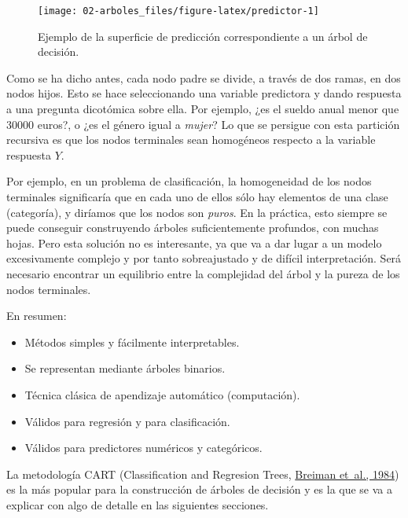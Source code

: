 \documentclass[
  spanish,
]{book}
\theoremstyle{break}
\theoremstyle{definition}
\theoremstyle{definition}
\theoremstyle{definition}
\theoremstyle{definition}
\theoremstyle{remark}
\begin{document}
\begin{figure}[!htb]

{\centering \texttt{[image: 02-arboles\_files/figure-latex/predictor-1]} 

}

\caption{Ejemplo de la superficie de predicción correspondiente a un árbol de decisión.}\label{fig:predictor}
\end{figure}

Como se ha dicho antes, cada nodo padre se divide, a través de dos ramas, en dos nodos hijos.
Esto se hace seleccionando una variable predictora y dando respuesta a una pregunta dicotómica sobre ella.
Por ejemplo, ¿es el sueldo anual menor que 30000 euros?, o ¿es el género igual a \emph{mujer}?
Lo que se persigue con esta partición recursiva es que los nodos terminales sean homogéneos respecto a la variable respuesta \(Y\).

Por ejemplo, en un problema de clasificación, la homogeneidad de los nodos terminales significaría que en cada uno de ellos sólo hay elementos de una clase (categoría), y diríamos que los nodos son \emph{puros}.
En la práctica, esto siempre se puede conseguir construyendo árboles suficientemente profundos, con muchas hojas.
Pero esta solución no es interesante, ya que va a dar lugar a un modelo excesivamente complejo y por tanto sobreajustado y de difícil interpretación.
Será necesario encontrar un equilibrio entre la complejidad del árbol y la pureza de los nodos terminales.

En resumen:

\begin{itemize}
\item
  Métodos simples y fácilmente interpretables.
\item
  Se representan mediante árboles binarios.
\item
  Técnica clásica de apendizaje automático (computación).
\item
  Válidos para regresión y para clasificación.
\item
  Válidos para predictores numéricos y categóricos.
\end{itemize}

La metodología CART (Classification and Regresion Trees, \protect\hyperlink{ref-breiman1984classification}{Breiman et~al., 1984}) es la más popular para la construcción de árboles de decisión y es la que se va a explicar con algo de detalle en las siguientes secciones.
\end{document}
